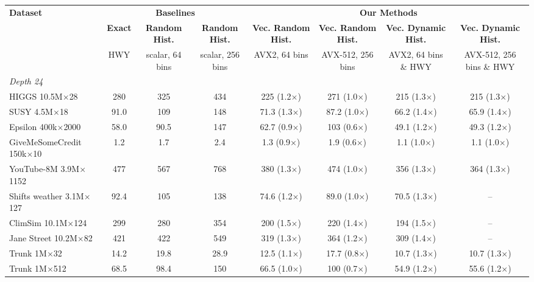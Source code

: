 \begin{table}[p]
    \centering
    \ContinuedFloat
    \footnotesize
    \setlength{\tabcolsep}{2.5pt}
    \begin{tabular}{l|ccc|cccc}
        \hline
        \multirow{3}{*}{\textbf{Dataset}} & \multicolumn{3}{c|}{\textbf{Baselines}} & \multicolumn{4}{c}{\textbf{Our Methods}} \\
         & \textbf{Exact} & \textbf{Random Hist.} & \textbf{Random Hist.} & \textbf{Vec. Random Hist.} & \textbf{Vec. Random Hist.} & \textbf{Vec. Dynamic Hist.} & \textbf{Vec. Dynamic Hist.} \\
         & \scriptsize HWY & \scriptsize scalar, 64 bins & \scriptsize scalar, 256 bins & \scriptsize AVX2, 64 bins & \scriptsize AVX-512, 256 bins & \scriptsize AVX2, 64 bins \& HWY & \scriptsize AVX-512, 256 bins \& HWY \\
        \hline
        \multicolumn{8}{l}{\textit{Depth 24}} \\
        HIGGS 10.5M$\times$28 & 280 & 325 & 434 & 225 (1.2$\times$) & 271 (1.0$\times$) & 215 (1.3$\times$) & 215 (1.3$\times$) \\
        SUSY 4.5M$\times$18 & 91.0 & 109 & 148 & 71.3 (1.3$\times$) & 87.2 (1.0$\times$) & 66.2 (1.4$\times$) & 65.9 (1.4$\times$) \\
        Epsilon 400k$\times$2000 & 58.0 & 90.5 & 147 & 62.7 (0.9$\times$) & 103 (0.6$\times$) & 49.1 (1.2$\times$) & 49.3 (1.2$\times$) \\
        GiveMeSomeCredit 150k$\times$10 & 1.2 & 1.7 & 2.4 & 1.3 (0.9$\times$) & 1.9 (0.6$\times$) & 1.1 (1.0$\times$) & 1.1 (1.0$\times$) \\
        YouTube-8M 3.9M$\times$1152 & 477 & 567 & 768 & 380 (1.3$\times$) & 474 (1.0$\times$) & 356 (1.3$\times$) & 364 (1.3$\times$) \\
        Shifts weather 3.1M$\times$127 & 92.4 & 105 & 138 & 74.6 (1.2$\times$) & 89.0 (1.0$\times$) & 70.5 (1.3$\times$) & -- \\
        ClimSim 10.1M$\times$124 & 299 & 280 & 354 & 200 (1.5$\times$) & 220 (1.4$\times$) & 194 (1.5$\times$) & -- \\
        Jane Street 10.2M$\times$82 & 421 & 422 & 549 & 319 (1.3$\times$) & 364 (1.2$\times$) & 309 (1.4$\times$) & -- \\
        Trunk 1M$\times$32 & 14.2 & 19.8 & 28.9 & 12.5 (1.1$\times$) & 17.7 (0.8$\times$) & 10.7 (1.3$\times$) & 10.7 (1.3$\times$) \\
        Trunk 1M$\times$512 & 68.5 & 98.4 & 150 & 66.5 (1.0$\times$) & 100 (0.7$\times$) & 54.9 (1.2$\times$) & 55.6 (1.2$\times$) \\

\end{tabular}
\end{table}
